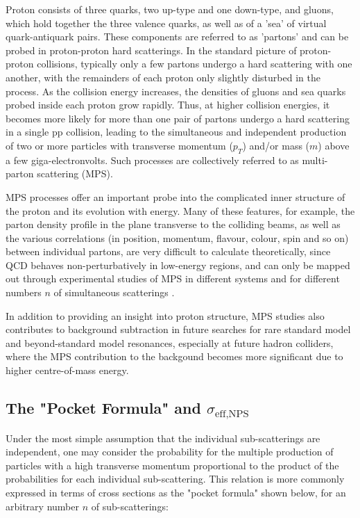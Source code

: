 \documentclass[10pt,twocolumn]{article}
\begin{document}
Proton consists of three quarks, two up-type and one down-type, and gluons, which hold together the three valence quarks, as well as of a 'sea' of virtual quark-antiquark pairs. These components are referred to as 'partons' and can be probed in proton-proton hard scatterings. In the standard picture of proton-proton collisions, typically only a few partons undergo a hard scattering with one another, with the remainders of each proton only slightly disturbed in the process. As the collision energy increases, the densities of gluons and sea quarks probed inside each proton grow rapidly. Thus, at higher collision energies, it becomes more likely for more than one pair of partons undergo a hard scattering in a single pp collision, leading to the simultaneous and independent production of two or more particles with transverse momentum ($p_T$) and/or mass ($m$) above a few giga-electronvolts. Such processes are collectively referred to as multi-parton scattering (MPS).

MPS processes offer an important probe into the complicated inner structure of the proton and its evolution with energy.\cite{DIEHL_MPI}\cite{BLOK_MPS} Many of these features, for example, the parton density profile in the plane transverse to the colliding beams, as well as the various correlations (in position, momentum, flavour, colour, spin and so on) between individual partons, are very difficult to calculate theoretically, since QCD behaves non-perturbatively in low-energy regions, and can only be mapped out through experimental studies of MPS in different systems and for different numbers $n$ of simultaneous scatterings \cite{MPI_LHC}.

In addition to providing an insight into proton structure, MPS studies also contributes to background subtraction in future searches for rare standard model and beyond-standard model resonances, especially at future hadron colliders, where the MPS contribution to the backgound becomes more significant due to higher centre-of-mass energy.\cite{DdE_TPS}\cite{YJZ_TRI_JPSI}

\subsection{The "Pocket Formula" and $\sigma_{\text{eff,NPS}}$}

Under the most simple assumption that the individual sub-scatterings are independent, one may consider the probability for the multiple production of particles with a high transverse momentum proportional to the product of the probabilities for each individual sub-scattering. This relation is more commonly expressed in terms of cross sections as the "pocket formula" shown below, for an arbitrary number $n$ of sub-scatterings:
\end{document}
